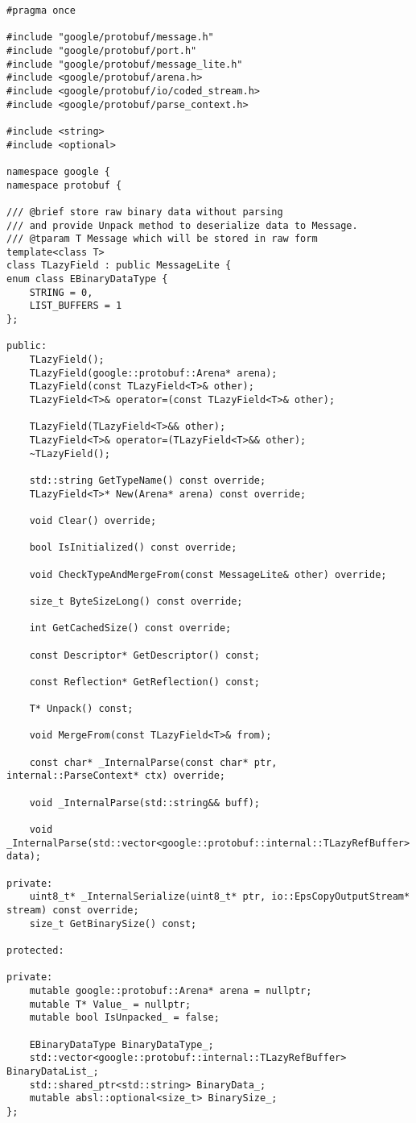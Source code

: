 \begin{lstlisting}[style=CodeListing, label=sec_impl:code:lazy_field_h, caption={Определение класса LazyField}]
#pragma once

#include "google/protobuf/message.h"
#include "google/protobuf/port.h"
#include "google/protobuf/message_lite.h"
#include <google/protobuf/arena.h>
#include <google/protobuf/io/coded_stream.h>
#include <google/protobuf/parse_context.h>

#include <string>
#include <optional>

namespace google {
namespace protobuf {

/// @brief store raw binary data without parsing
/// and provide Unpack method to deserialize data to Message.
/// @tparam T Message which will be stored in raw form
template<class T>
class TLazyField : public MessageLite {
enum class EBinaryDataType {
    STRING = 0,
    LIST_BUFFERS = 1
};

public:
    TLazyField();
    TLazyField(google::protobuf::Arena* arena);
    TLazyField(const TLazyField<T>& other);
    TLazyField<T>& operator=(const TLazyField<T>& other);

    TLazyField(TLazyField<T>&& other);
    TLazyField<T>& operator=(TLazyField<T>&& other);
    ~TLazyField();

    std::string GetTypeName() const override;
    TLazyField<T>* New(Arena* arena) const override;

    void Clear() override;

    bool IsInitialized() const override;

    void CheckTypeAndMergeFrom(const MessageLite& other) override;

    size_t ByteSizeLong() const override;

    int GetCachedSize() const override;

    const Descriptor* GetDescriptor() const;

    const Reflection* GetReflection() const;

    T* Unpack() const;

    void MergeFrom(const TLazyField<T>& from);

    const char* _InternalParse(const char* ptr, internal::ParseContext* ctx) override;

    void _InternalParse(std::string&& buff);

    void _InternalParse(std::vector<google::protobuf::internal::TLazyRefBuffer> data);

private:
    uint8_t* _InternalSerialize(uint8_t* ptr, io::EpsCopyOutputStream* stream) const override;
    size_t GetBinarySize() const;

protected:

private:
    mutable google::protobuf::Arena* arena = nullptr;
    mutable T* Value_ = nullptr;
    mutable bool IsUnpacked_ = false;

    EBinaryDataType BinaryDataType_;
    std::vector<google::protobuf::internal::TLazyRefBuffer> BinaryDataList_;
    std::shared_ptr<std::string> BinaryData_;
    mutable absl::optional<size_t> BinarySize_;
};

\end{lstlisting}

